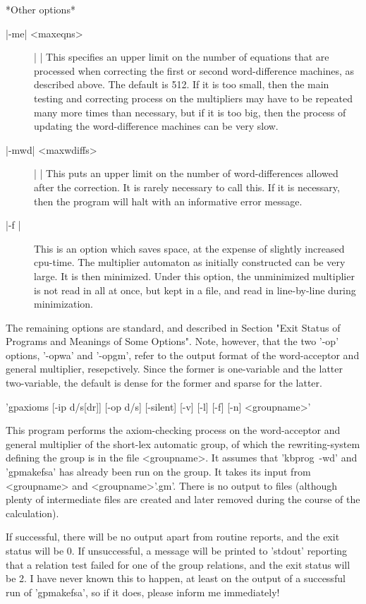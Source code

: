 *Other options*
\begin{description}
\item[|-me| <maxeqns>] | |\newline
This specifies an upper limit on the number of equations that are processed
when correcting the first or second word-difference machines, as described
above. The default is 512. If it is too small, then the main testing and
correcting process on the multipliers may have to be repeated many more times
than necessary, but if it is too big, then the process of updating the
word-difference machines can be very slow.
\item[|-mwd| <maxwdiffs>] | |\newline
This puts an upper limit on the number of word-differences allowed after the
correction. It is rarely necessary to call this. If it is necessary, then the
program will halt with an informative error message.
\item[|-f |]
This is an option which saves space, at the expense of slightly increased
cpu-time. The multiplier automaton as initially constructed can be very
large. It is then minimized. Under this option, the unminimized multiplier
is not read in all at once, but kept in a file, and read in line-by-line
during minimization.
\end{description}
The remaining options are standard, and described in Section
"Exit Status of Programs and Meanings of Some Options".
Note, however, that the two '-op' options,
'-opwa' and '-opgm', refer to the output format of the word-acceptor and
general multiplier, resepctively. Since the former is one-variable and
the latter two-variable, the default is dense for the former and sparse
for the latter.

'gpaxioms [-ip d/s[dr]] [-op d/s] [-silent] [-v] [-l] [-f] [-n] <groupname>'

This program performs the axiom-checking process on the word-acceptor and
general multiplier of the short-lex automatic group,
of which the rewriting-system defining the group is in the file <groupname>.
It assumes that 'kbprog\ -wd' and 'gpmakefsa' has already been run on the
group.
It takes its input from <groupname> and <groupname>'.gm'. 
There is no output to files (although plenty of intermediate files are
created and later removed during the course of the calculation).

If successful, there will be no output apart from routine reports, and the exit
status will be 0. If unsuccessful, a message will be printed to 'stdout'
reporting that a relation test failed for one of the group relations, and
the exit status will be 2. I have never known this to happen, at least on
the output of a successful run of 'gpmakefsa', so if it does, please inform
me immediately!

